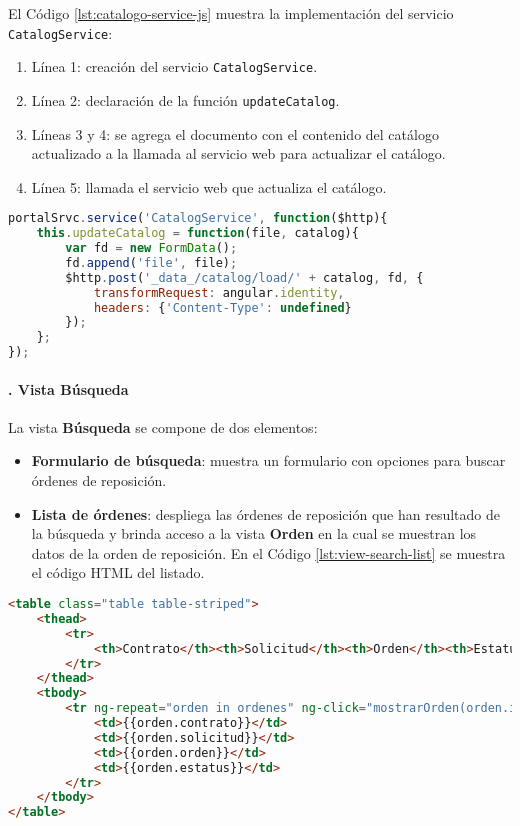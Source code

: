El Código \ref{lst:catalogo-service-js} muestra la implementación del servicio \texttt{CatalogService}:
\begin{enumerate}
	\item Línea 1: creación del servicio \texttt{CatalogService}.
	\item Línea 2: declaración de la función \texttt{updateCatalog}.
	\item Líneas 3 y 4: se agrega el documento con el contenido del catálogo actualizado a la llamada al servicio web para actualizar el catálogo.
	\item Línea 5: llamada el servicio web que actualiza el catálogo.
\end{enumerate}
\begin{lstlisting}[language=Javascript, caption={Servicio en \textit{AngularJS} actualizar un catálogo.}, captionpos=b, label={lst:catalogo-service-js}]
portalSrvc.service('CatalogService', function($http){
	this.updateCatalog = function(file, catalog){
		var fd = new FormData();
		fd.append('file', file);
		$http.post('_data_/catalog/load/' + catalog, fd, {
			transformRequest: angular.identity,
			headers: {'Content-Type': undefined}
		});
    };	
});
\end{lstlisting}

\pagebreak

\paragraph{. Vista Búsqueda\\}
La vista \textbf{Búsqueda} se compone de dos elementos:
\begin{itemize}
	\item \textbf{Formulario de búsqueda}: muestra un formulario con opciones para buscar órdenes de reposición.
	\item \textbf{Lista de órdenes}: despliega las órdenes de reposición que han resultado de la búsqueda y brinda acceso a la vista \textbf{Orden} en la cual se muestran los datos de la orden de reposición. En el Código \ref{lst:view-search-list} se muestra el código HTML del listado.
\end{itemize}

\begin{lstlisting}[language=HTML, captionpos=b, caption={Plantilla que muestra el resultado de la búsqueda de órdenes de reposición.}, label={lst:view-search-list}]
<table class="table table-striped">
	<thead>
		<tr>
			<th>Contrato</th><th>Solicitud</th><th>Orden</th><th>Estatus</th>
		</tr>
	</thead>
	<tbody>
		<tr ng-repeat="orden in ordenes" ng-click="mostrarOrden(orden.id, $event)">
			<td>{{orden.contrato}}</td>
			<td>{{orden.solicitud}}</td>
			<td>{{orden.orden}}</td>
			<td>{{orden.estatus}}</td>
		</tr>
	</tbody>
</table>
\end{lstlisting}

